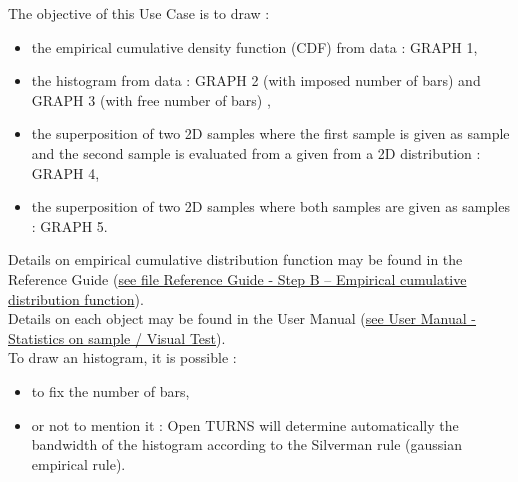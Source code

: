 \renewcommand{\filename}{docUC_InputWithData_EmpiricalDrawing.tex}
\renewcommand{\filetitle}{UC : Drawing Empirical CDF, Histogram, Clouds / PDF or superposition of two clouds from data}

\HeaderIIILevel






The objective of this Use Case is to draw :
\begin{itemize}
\item the empirical cumulative density function (CDF) from data : GRAPH 1,
\item the histogram from data : GRAPH 2 (with imposed number of bars) and GRAPH 3 (with free number of bars) ,
\item the superposition of two 2D samples where the first sample is given as sample and the second sample is evaluated from a given from a 2D distribution : GRAPH 4,
\item the superposition of two 2D samples where both samples are given as samples : GRAPH 5.
\end{itemize}



Details on empirical cumulative distribution function may be found in the Reference Guide (\href{OpenTURNS_ReferenceGuide.pdf}{see file Reference Guide - Step B -- Empirical cumulative distribution function}).\\

Details on each object may be found in the User Manual  (\href{OpenTURNS_UserManual_TUI.pdf}{see User Manual - Statistics on sample / Visual Test}).\\





To draw an histogram, it is possible :
\begin{itemize}
\item to fix the number of bars,
\item or not to mention it : Open TURNS will determine automatically the bandwidth of the histogram according to the Silverman rule (gaussian empirical rule).
\end{itemize}

